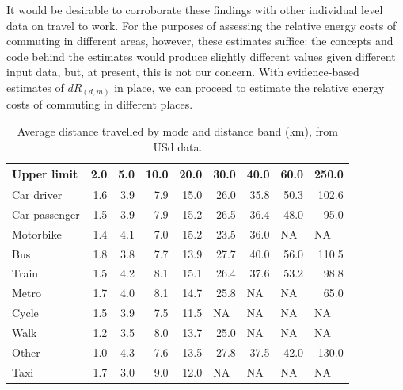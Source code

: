 \documentclass[a4paper, 11pt, twoside]{Thesis}
\begin{document}
It would be desirable to corroborate these findings with other individual level
data on travel to work. For the purposes of assessing the relative energy
costs of commuting in different areas, however, these estimates suffice:
the concepts and code behind the estimates would produce slightly different
values given different input data, but, at present, this is not our concern.
With evidence-based estimates of $dR_{(d,m)}$ in place,
we can proceed to estimate the relative energy costs of commuting in different
places. 

\begin{table}[htbp]
\caption[Average distance travelled by mode and distance band]
{Average distance travelled by mode and distance band (km),
from USd data.}\label{tdboxes}
\begin{center}
\begin{tabular}{lrrrrrrrr}
\toprule
Upper limit & 2.0 & 5.0 & 10.0 & 20.0 & 30.0 & 40.0 & 60.0 & 250.0 \\ \midrule
Car driver & 1.6 & 3.9 & 7.9 & 15.0 & 26.0 & 35.8 & 50.3 & 102.6 \\
Car passenger & 1.5 & 3.9 & 7.9 & 15.2 & 26.5 & 36.4 & 48.0 & 95.0 \\
Motorbike & 1.4 & 4.1 & 7.0 & 15.2 & 23.5 & 36.0 & \multicolumn{1}{l}{NA} & \multicolumn{1}{l}{NA} \\
Bus & 1.8 & 3.8 & 7.7 & 13.9 & 27.7 & 40.0 & 56.0 & 110.5 \\
Train & 1.5 & 4.2 & 8.1 & 15.1 & 26.4 & 37.6 & 53.2 & 98.8 \\
Metro & 1.7 & 4.0 & 8.1 & 14.7 & 25.8 & \multicolumn{1}{l}{NA} & \multicolumn{1}{l}{NA} & 65.0 \\
Cycle & 1.5 & 3.9 & 7.5 & 11.5 & \multicolumn{1}{l}{NA} & \multicolumn{1}{l}{NA} & \multicolumn{1}{l}{NA} & \multicolumn{1}{l}{NA} \\
Walk & 1.2 & 3.5 & 8.0 & 13.7 & 25.0 & \multicolumn{1}{l}{NA} & \multicolumn{1}{l}{NA} & \multicolumn{1}{l}{NA} \\
Other & 1.0 & 4.3 & 7.6 & 13.5 & 27.8 & 37.5 & 42.0 & 130.0 \\
Taxi & 1.7 & 3.0 & 9.0 & 12.0 & \multicolumn{1}{l}{NA} & \multicolumn{1}{l}{NA} & \multicolumn{1}{l}{NA} & \multicolumn{1}{l}{NA} \\
\bottomrule
\end{tabular}
\end{center}
\end{table}
\end{document}
